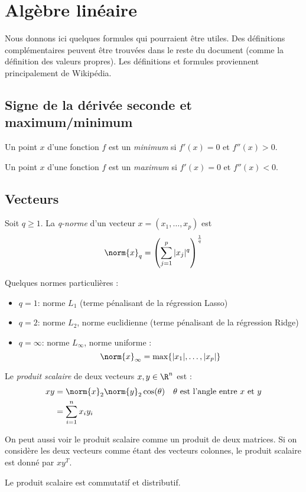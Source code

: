 \section{Algèbre linéaire}
    Nous donnons ici quelques formules qui pourraient être utiles. Des définitions complémentaires peuvent être trouvées dans le reste du document (comme la définition des valeurs propres). Les définitions et formules proviennent principalement de Wikipédia.

    \subsection{Signe de la dérivée seconde et maximum/minimum}
        Un point \(x\) d'une fonction \(f\) est un \textit{minimum} si \(f'(x) = 0\) et \(f''(x) > 0\).

        Un point \(x\) d'une fonction \(f\) est un \textit{maximum} si \(f'(x) = 0\) et \(f''(x) < 0\).

    \subsection{Vecteurs}
        \begin{definition}
            Soit \(q \geq 1\). La \textit{q-norme} d'un vecteur \(x = (x_1, \dots, x_p)\) est
            \[
                \norm{x}_q = \left(\sum_{j=1}^p |x_j|^q\right)^{\frac{1}{q}}
            \]

            Quelques normes particulières :
            \begin{itemize}
                \item \(q = 1\): norme \(L_1\) (terme pénalisant de la régression Lasso)
                \item \(q = 2\): norme \(L_2\), norme euclidienne (terme pénalisant de la régression Ridge)
                \item \(q = \infty\): norme \(L_\infty\), norme uniforme :
                \[
                    \norm{x}_\infty = \max\{|x_1|, \dots, |x_p|\}
                \]
            \end{itemize}
        \end{definition}

        \begin{definition}
            Le \textit{produit scalaire} de deux vecteurs \(x, y \in \R^n\) est :
            \begin{align*}
                xy &= \norm{x}_2 \norm{y}_2 \cos(\theta) & \theta \text{ est l'angle entre \(x\) et \(y\)} \\
                &= \sum_{i=1}^n x_i y_i
            \end{align*}

            On peut aussi voir le produit scalaire comme un produit de deux matrices. Si on considère les deux vecteurs comme étant des vecteurs colonnes, le produit scalaire est donné par \(xy^T\).

            Le produit scalaire est commutatif et distributif.
        \end{definition}

